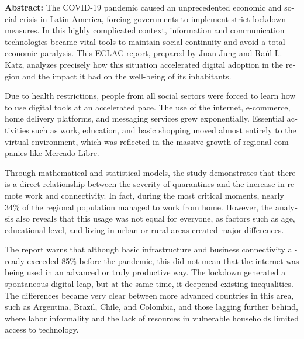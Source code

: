 \begin{tcolorbox}[colback=brown!8!white,colframe=brown!8!white,boxrule=0pt,arc=2pt,left=4pt,right=4pt,top=3pt,bottom=3pt,before skip=4pt,after skip=4pt]
\begin{otherlanguage}{english}
\sffamily\small \textbf{Abstract:} The COVID-19 pandemic caused an unprecedented economic and social crisis in Latin America, forcing governments to implement strict lockdown measures. In this highly complicated context, information and communication technologies became vital tools to maintain social continuity and avoid a total economic paralysis. This ECLAC report, prepared by Juan Jung and Raúl L. Katz, analyzes precisely how this situation accelerated digital adoption in the region and the impact it had on the well-being of its inhabitants.

Due to health restrictions, people from all social sectors were forced to learn how to use digital tools at an accelerated pace. The use of the internet, e-commerce, home delivery platforms, and messaging services grew exponentially. Essential activities such as work, education, and basic shopping moved almost entirely to the virtual environment, which was reflected in the massive growth of regional companies like Mercado Libre.

Through mathematical and statistical models, the study demonstrates that there is a direct relationship between the severity of quarantines and the increase in remote work and connectivity. In fact, during the most critical moments, nearly 34\% of the regional population managed to work from home. However, the analysis also reveals that this usage was not equal for everyone, as factors such as age, educational level, and living in urban or rural areas created major differences.

The report warns that although basic infrastructure and business connectivity already exceeded 85\% before the pandemic, this did not mean that the internet was being used in an advanced or truly productive way. The lockdown generated a spontaneous digital leap, but at the same time, it deepened existing inequalities. The differences became very clear between more advanced countries in this area, such as Argentina, Brazil, Chile, and Colombia, and those lagging further behind, where labor informality and the lack of resources in vulnerable households limited access to technology.


\end{otherlanguage}
\end{tcolorbox}
